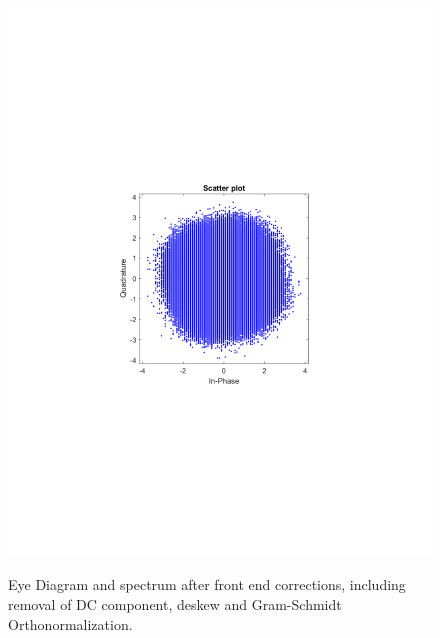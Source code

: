 \begin{refsection}
\begin{figure}[H]
\begin{minipage}{0.30\textwidth}
		\includegraphics[clip, trim=4cm 8cm 4cm 8cm, width=1\textwidth]{./sdf/m_qam_system/figures/expResults/homodyne/1_const_4GBdInSig13dB_AfFec.pdf}
		\label{fig:4GBdSpecBefFec}
	\end{minipage}
	\caption{Eye Diagram and spectrum after front end corrections, including removal of DC component, deskew and Gram-Schmidt Orthonormalization.}
\end{figure}


\end{refsection}
